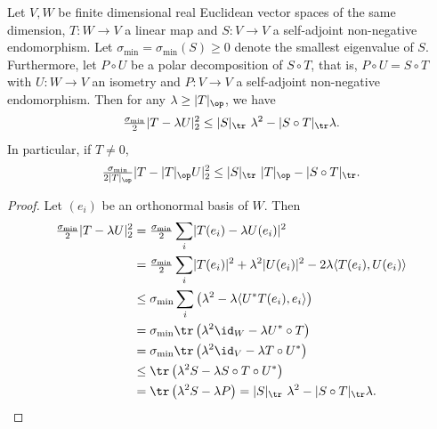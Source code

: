 \documentclass[a4paper,11pt]{amsart}
\numberwithin{equation}{section}
\begin{document}
\begin{lemma}\label{trace_inequality_polar_decomposition}
    Let \(V,W\) be finite dimensional real Euclidean vector spaces of the same dimension, \(T \colon W \to V\) a linear map and \(S \colon V \to V\) a self-adjoint non-negative endomorphism.
    Let \(\sigma_{\min} = \sigma_{\min}(S) \geq 0\) denote the smallest eigenvalue of \(S\).
    Furthermore, let \(P \circ U\) be a polar decomposition of \(S \circ T\), that is, \(P \circ U = S \circ T\) with \(U \colon W \to V\) an isometry and \(P \colon V \to V\) a self-adjoint non-negative endomorphism.
    Then for any \(\lambda \geq |T|_{\op}\), we have
    \[
    \tfrac{\sigma_{\min}}{2} \lvert T - \lambda U \rvert_2^2 \leq \lvert S \rvert_{\tr}\ \lambda^2 - \lvert S \circ T \rvert_{\tr} \lambda.
    \]
    In particular, if \(T \neq 0\),
    \[
    \tfrac{\sigma_{\min}}{2 |T|_{\op}} \lvert T - |T|_{\op} U \rvert_2^2 \leq \lvert S \rvert_{\tr}\ \lvert T \rvert_{\op} - \lvert S \circ T \rvert_{\tr}.
    \]
\end{lemma}
\begin{proof} Let $(e_i)$ be an orthonormal basis of $W$. Then
    \begin{align*}
        \tfrac{\sigma_{\min}}{2} \lvert T - \lambda U \rvert_2^2 &= \tfrac{\sigma_{\min}}{2} \sum_{i} \lvert T(e_i) - \lambda U(e_i) \rvert^2 \\
        &= \tfrac{\sigma_{\min}}{2} \sum_{i} \lvert T(e_i) \rvert^2 + \lambda^2 \lvert U(e_i) \rvert^2 - 2 \lambda \langle T(e_i), U(e_i) \rangle \\
        &\leq \sigma_{\min} \sum_{i} \left( \lambda^2 - \lambda \langle U^\ast T(e_i), e_i \rangle\right) \\
        &= \sigma_{\min} \tr \left(\lambda^2 \id_W - \lambda U^\ast \circ T \right) \\
        &= \sigma_{\min} \tr \left(\lambda^2 \id_V - \lambda T \circ U^\ast \right) \\
        &\leq \tr \left( \lambda^2 S  - \lambda S \circ T \circ U^\ast \right) \\
        &= \tr \left( \lambda^2 S  - \lambda P \right) = \lvert S \rvert_{\tr}\ \lambda^2 - \lvert S \circ T \rvert_{\tr} \lambda . \qedhere
    \end{align*}
\end{proof}




\printbibliography
\end{document}
